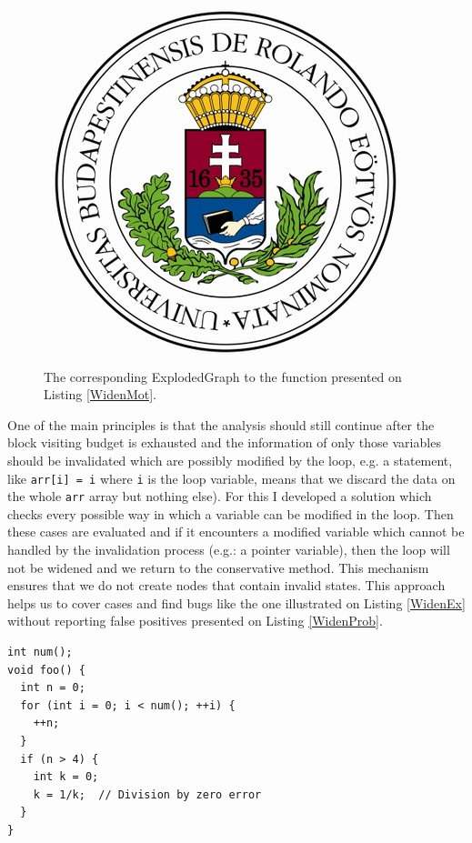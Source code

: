 \begin{figure}[h]
	\centering
	\includegraphics[scale=0.3]{img/elte-cimer}
	\caption{The corresponding ExplodedGraph to the function presented on 
		Listing \ref{WidenMot}.}
	\label{fig:eg_mot_1}
\end{figure}

One of the main principles is that the analysis should still continue after the block 
visiting budget is exhausted and the information of only those variables should be invalidated which are possibly modified by the loop, e.g. a statement, like \texttt{arr[i] = i} where \texttt{i} is the loop variable, means that we discard the data on the whole \texttt{arr} array but nothing else).
For this I developed a solution which checks every possible way in which a 
variable can be modified in the loop. Then these cases are evaluated and if it 
encounters a modified variable which cannot be handled by the invalidation 
process (e.g.: a pointer variable), then the loop will not be widened and we
return to the conservative method. This mechanism ensures that we do not create 
nodes that contain invalid states.
This approach helps us to cover cases and find bugs like the one illustrated on 
Listing \ref{WidenEx} without reporting false positives  
presented on Listing \ref{WidenProb}.

\begin{lstlisting}
int num();
void foo() {
  int n = 0;
  for (int i = 0; i < num(); ++i) {
    ++n;
  }
  if (n > 4) {
    int k = 0;
    k = 1/k;  // Division by zero error
  }
}\end{lstlisting}

